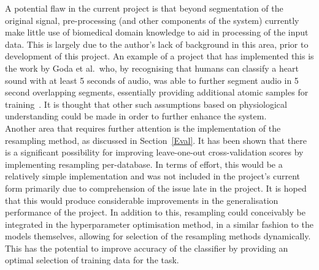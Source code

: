 \documentclass[titlepage, 12pt]{scrartcl} \usepackage{enumitem}
\begin{document}
A potential flaw in the current project is that beyond segmentation of the
original signal, pre-processing (and other components of the system) currently
make little use of biomedical domain knowledge to aid in processing of the
input data.  This is largely due to the author's lack of background in this
area, prior to development of this project. An example of a project that has
implemented this is the work by Goda et al.\ who, by recognising that humans
can classify a heart sound with at least 5 seconds of audio, was able to
further segment audio in 5 second overlapping segments, essentially providing
additional atomic samples for training~\parencite{Goda2016}. It is thought that
other such assumptions based on physiological understanding could be made in
order to further enhance the system.\\

Another area that requires further attention is the implementation of the resampling
method, as discussed in Section~\ref{Eval}. It has been shown that there is a
significant possibility for improving leave-one-out cross-validation scores by
implementing resampling per-database. In terms of effort, this would be a
relatively simple implementation and was not included in the project's current
form primarily due to comprehension of the issue late in the project. It is
hoped that this would produce considerable improvements in the generalisation
performance of the project. In addition to this, resampling could conceivably
be integrated in the hyperparameter optimisation method, in a similar fashion
to the models themselves, allowing for selection of the resampling methods
dynamically. This has the potential to improve accuracy of the classifier by
providing an optimal selection of training data for the task.\\
\end{document}
